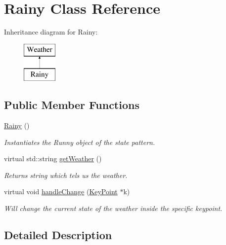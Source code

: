 \hypertarget{classRainy}{}\section{Rainy Class Reference}
\label{classRainy}
Inheritance diagram for Rainy\+:\begin{figure}[H]
\begin{center}
\leavevmode
\includegraphics[height=2.000000cm]{classRainy}
\end{center}
\end{figure}
\subsection*{Public Member Functions}
\begin{DoxyCompactItemize}
\item 
\mbox{\label{classRainy_aae3bc68f19aacf2a863e9524b0b3e302}} 
\hyperlink{classRainy_aae3bc68f19aacf2a863e9524b0b3e302}{Rainy} ()
\begin{DoxyCompactList}\small\item\em Instantiates the Runny object of the state pattern. \end{DoxyCompactList}\item 
virtual std\+::string \hyperlink{classRainy_af113a2dbc0380d45e0df2b0abc86b84a}{get\+Weather} ()
\begin{DoxyCompactList}\small\item\em Returns string which tels us the weather. \end{DoxyCompactList}\item 
virtual void \hyperlink{classRainy_ad6d6645418cecd7a2329e323e0c7c37a}{handle\+Change} (\hyperlink{classKeyPoint}{Key\+Point} $\ast$k)
\begin{DoxyCompactList}\small\item\em Will change the current state of the weather inside the specific keypoint. \end{DoxyCompactList}\end{DoxyCompactItemize}


\subsection{Detailed Description}


